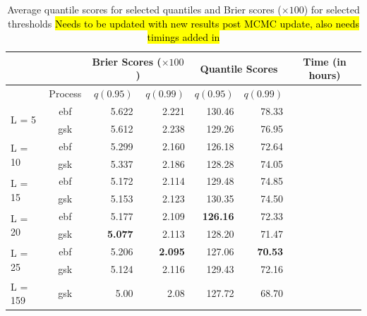 \documentclass[11pt]{article}
\begin{document}
\begin{table}[htbp]
\caption{Average quantile scores for selected quantiles and Brier scores ($\times 100$) for selected thresholds \hl{Needs to be updated with new results post MCMC update, also needs timings added in}}
\centering
\small
  \begin{tabular}{lc|rr|rr|c}
   \multicolumn{2}{c}{  }& \multicolumn{2}{c|}{Brier Scores ($\times 100$)} & \multicolumn{2}{|c|}{Quantile Scores} & Time (in hours)\\
   \hline
   & Process & $q(0.95)$ & $q(0.99)$ & $q(0.95)$ & $q(0.99)$\\
   \hline
  \multirow{2}{*}{L = 5} & ebf & 5.622 & 2.221 & 130.46 & 78.33 & \\
                         & gsk & 5.612 & 2.238 & 129.26 & 76.95 & \\
   \hline
  \multirow{2}{*}{L = 10} & ebf & 5.299 & 2.160 & 126.18 & 72.64 & \\
                          & gsk & 5.337 & 2.186 & 128.28 & 74.05 & \\
   \hline
  \multirow{2}{*}{L = 15} & ebf & 5.172 & 2.114 & 129.48 & 74.85 & \\
                          & gsk & 5.153 & 2.123 & 130.35 & 74.50 & \\
   \hline
  \multirow{2}{*}{L = 20} & ebf & 5.177 & 2.109 & \textbf{126.16} & 72.33 & \\
                          & gsk & \textbf{5.077} & 2.113 & 128.20 & 71.47 & \\
   \hline
  \multirow{2}{*}{L = 25} & ebf & 5.206 & \textbf{2.095} & 127.06 & \textbf{70.53} & \\
                          & gsk & 5.124 & 2.116 & 129.43 & 72.16 & \\
  \hline
  L = 159 & gsk & 5.00 & 2.08 & 127.72 & 68.70 & \\
  \hline
	\end{tabular}
\end{table}


\end{document}
